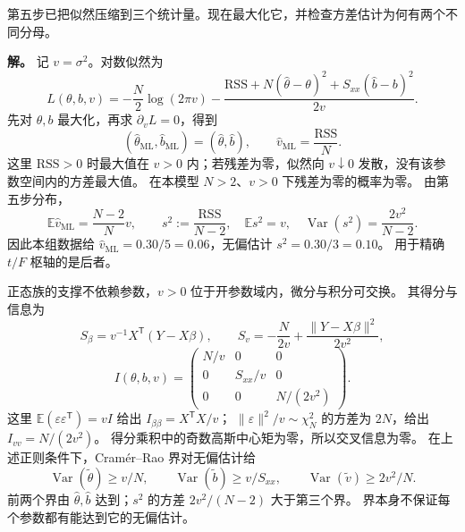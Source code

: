 \begin{exbox}
第五步已把似然压缩到三个统计量。现在最大化它，并检查方差估计为何有两个不同分母。

\textbf{解。} 记 $v=\sigma^2$。对数似然为
\[
 L(\theta,b,v)=-\frac N2\log(2\pi v)
 -\frac{\mathrm{RSS}+N(\widehat\theta-\theta)^2+S_{xx}(\widehat b-b)^2}{2v}.
\]
先对 $\theta,b$ 最大化，再求 $\partial_vL=0$，得到
\[
 (\widehat\theta_{\mathrm{ML}},\widehat b_{\mathrm{ML}})
 =(\widehat\theta,\widehat b),\qquad
 \widehat v_{\mathrm{ML}}=\frac{\mathrm{RSS}}N.
\]
这里 $\mathrm{RSS}>0$ 时最大值在 $v>0$ 内；若残差为零，似然向 $v\downarrow0$ 发散，没有该参数空间内的方差最大值。
在本模型 $N>2$、$v>0$ 下残差为零的概率为零。
由第五步分布，
\[
 \mathbb E\widehat v_{\mathrm{ML}}=\frac{N-2}N v,
 \qquad s^2:=\frac{\mathrm{RSS}}{N-2},\quad
 \mathbb Es^2=v,\quad\operatorname{Var}(s^2)=\frac{2v^2}{N-2}.
\]
因此本组数据给 $\widehat v_{\mathrm{ML}}=0.30/5=0.06$，无偏估计 $s^2=0.30/3=0.10$。
用于精确 $t/F$ 枢轴的是后者。

正态族的支撑不依赖参数，$v>0$ 位于开参数域内，微分与积分可交换。
其得分与信息为
\[
 S_\beta=v^{-1}X^{\mathsf T}(Y-X\beta),\qquad
 S_v=-\frac N{2v}+\frac{\|Y-X\beta\|^2}{2v^2},
\]
\[
 I(\theta,b,v)=\begin{pmatrix}
 N/v&0&0\\0&S_{xx}/v&0\\0&0&N/(2v^2)
 \end{pmatrix}.
\]
这里 $\mathbb E(\varepsilon\varepsilon^{\mathsf T})=vI$ 给出 $I_{\beta\beta}=X^{\mathsf T}X/v$；
$\|\varepsilon\|^2/v\sim\chi_N^2$ 的方差为 $2N$，给出 $I_{vv}=N/(2v^2)$。
得分乘积中的奇数高斯中心矩为零，所以交叉信息为零。
在上述正则条件下，Cram\'er--Rao 界对无偏估计给
\[
 \operatorname{Var}(\widetilde\theta)\ge v/N,\qquad
 \operatorname{Var}(\widetilde b)\ge v/S_{xx},\qquad
 \operatorname{Var}(\widetilde v)\ge2v^2/N.
\]
前两个界由 $\widehat\theta,\widehat b$ 达到；$s^2$ 的方差 $2v^2/(N-2)$ 大于第三个界。
界本身不保证每个参数都有能达到它的无偏估计。
\end{exbox}

